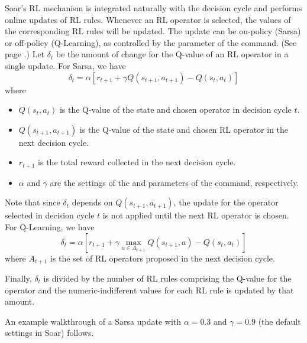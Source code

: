 Soar's RL mechanism is integrated naturally with the decision cycle and performs online updates of RL rules.
Whenever an RL operator is selected, the values of the corresponding RL rules will be updated.
The update can be on-policy (Sarsa) or off-policy (Q-Learning), as controlled by the  parameter of the  command. (See page \pageref{rl}.)
Let $\delta_t$ be the amount of change for the Q-value of an RL operator in a single update.
For Sarsa, we have
$$ \delta_t = \alpha \left[ r_{t+1} + \gamma Q(s_{t+1}, a_{t+1}) - Q(s_t, a_t) \right] $$
where 
\begin{itemize}
	\item $Q(s_t, a_t)$ is the Q-value of the state and chosen operator in decision cycle $t$.
	\item $Q(s_{t+1}, a_{t+1})$ is the Q-value of the state and chosen RL operator in the next decision cycle.
	\item $r_{t+1}$ is the total reward collected in the next decision cycle.
	\item $\alpha$ and $\gamma$ are the settings of the  and  parameters of the  command, respectively.
\end{itemize}

Note that since $\delta_t$ depends on $Q(s_{t+1}, a_{t+1})$, the update for the operator selected in decision cycle $t$ is not applied until the next RL operator is chosen.
For Q-Learning, we have
$$ \delta_t = \alpha \left[ r_{t+1} + \gamma \underset{a \in A_{t+1}}{\max} Q(s_{t+1}, a) - Q(s_t, a_t) \right] $$
where $A_{t+1}$ is the set of RL operators proposed in the next decision cycle.

Finally, $\delta_t$ is divided by the number of RL rules comprising the Q-value for the operator and the numeric-indifferent values for each RL rule is updated by that amount.

An example walkthrough of a Sarsa update with $\alpha = 0.3$ and $\gamma = 0.9$ (the default settings in Soar) follows.

